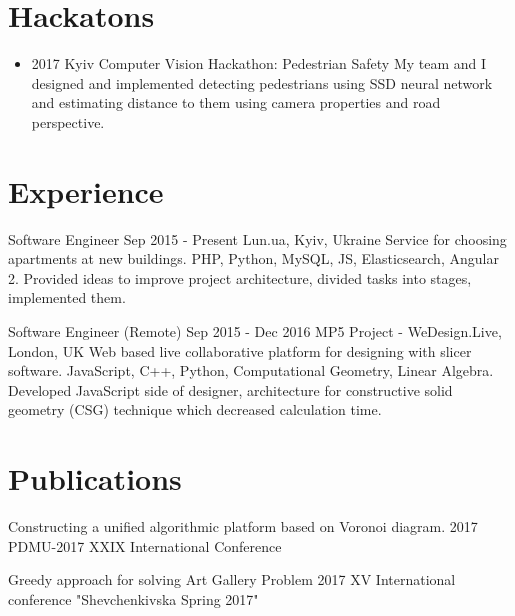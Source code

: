\documentclass[letterpaper]{twentysecondcv} %
\begin{document}

\section{Hackatons}
\begin{itemize}
    \item \projectItem
        {2017 Kyiv Computer Vision Hackathon: Pedestrian Safety }
        {My team and I designed and implemented detecting pedestrians using SSD neural network and estimating distance to them using camera properties and road perspective.}
\end{itemize}

\section{Experience}

\begin{twenty} %
	\twentyitemwithoutbegin
    	{}
        {Software Engineer}
        {Sep 2015 - Present}
        {Lun.ua, Kyiv, Ukraine}
        {Service for choosing apartments at new buildings.
        {PHP, Python, MySQL, JS, Elasticsearch, Angular 2. Provided ideas to improve project architecture, divided tasks into stages, implemented them.
        }
    }

    \twentyitemwithoutbegin
   	    {}
        {Software Engineer (Remote)}
        {Sep 2015 - Dec 2016 }
        {MP5 Project - WeDesign.Live, London, UK}
        {Web based live collaborative platform for designing with slicer software.
        {JavaScript, C++, Python, Computational Geometry, Linear Algebra. Developed JavaScript side of designer, architecture for constructive solid geometry (CSG) technique which decreased calculation time.
        }
        }
\end{twenty}
\section{Publications}
\begin{twenty}
	\twentyitemwithoutbegin
    	{}
        {Constructing a unified algorithmic platform based on Voronoi diagram.}
        {2017}
        {PDMU-2017 XXIX International Conference}
        {}
        \end{twenty}
\begin{twenty}
	\twentyitemwithoutbegin
    	{}
        {Greedy approach for solving Art Gallery Problem}
        {2017}
        {XV International conference "Shevchenkivska Spring 2017"}
        {}
\end{twenty}
\end{document}
